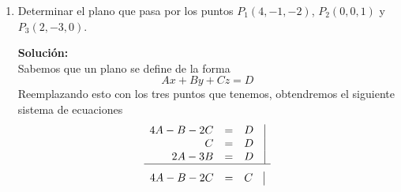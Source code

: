 \documentclass[12pt]{article}
\newenvironment{solucion}
{\begin{mdframed}[backgroundcolor=black!10]
		{\bf Solución:}\\
	}
	{
	\end{mdframed}
}
\newenvironment{preguntas}
{\begin{enumerate}\itemsep12pt
	}
	{
	\end{enumerate}
}
\begin{document}
\begin{preguntas}
\begin{solucion}
\begin{enumerate}[a)]
$$\begin{pmatrix}
			15\\
			-5\\
			-5
			\end{pmatrix}  + 3 \begin{pmatrix}
			2\\
			1\\
			5
			\end{pmatrix} = \begin{pmatrix}
			21\\
			-2\\
			10
			\end{pmatrix} $$
			Para obtener un vector perpendicular, podemos hacer producto cruz con cualquier otro vector arbitrario. Para hacer los calculos simples, utilizaremos
			$$v_7 = \begin{pmatrix}
			1\\
			0\\
			0
			\end{pmatrix} $$
			Luego, 
			$$v_8 = v_6 \times v_7 = \begin{pmatrix}
			21\\
			-2\\
			10
			\end{pmatrix} \times \begin{pmatrix}
			1\\
			0\\
			0
			\end{pmatrix} = 10j + 2k = \begin{pmatrix}
			0\\
			10\\
			2
			\end{pmatrix}$$
\end{enumerate}
\end{solucion}
\item Determinar el plano que pasa por los puntos $P_1(4,-1,-2)$, $P_2(0,0,1)$ y $P_3(2,-3,0)$.
\begin{solucion}
Sabemos que un plano se define de la forma
		$$Ax +By + Cz = D$$
		Reemplazando esto con los tres puntos que tenemos, obtendremos el siguiente sistema de ecuaciones
		$$
		\begin{array}{rcrr}
		4A-B-2C & = & D& \vline\\
		C & = & D & \vline\\
		2A-3B & = & D &\vline\\
		\hline
		\end{array}
		$$
		$$
		\begin{array}{rcrr}
		4A-B-2C & = & C& \vline\\

\end{array}$$
\end{solucion}
\end{preguntas}
\end{document}
